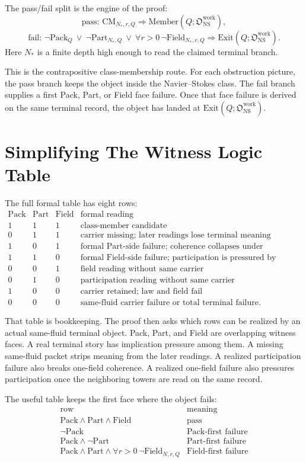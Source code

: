 \documentclass[11pt]{article}
\newcommand{\NS}{\mathrm{NS}}
\newcommand{\Pack}{\mathrm{Pack}}
\newcommand{\Part}{\mathrm{Part}}
\newcommand{\Field}{\mathrm{Field}}
\newcommand{\Member}{\mathrm{Member}}
\newcommand{\Exit}{\mathrm{Exit}}
\newcommand{\CM}{\mathrm{CM}}
\newcommand{\Owork}{\mathfrak O_{\NS}^{\mathrm{work}}}
\begin{document}
The pass/fail split is the engine of the proof:
\[
  \text{pass: }\CM_{N_*,r,Q}\Longrightarrow\Member(Q;\Owork),
\]
\[
  \text{fail: }\neg\Pack_Q\ \vee\ \neg\Part_{N_*,Q}\ \vee\ \forall r>0\,\neg\Field_{N_*,r,Q}
  \Longrightarrow \Exit(Q;\Owork).
\]
Here \(N_*\) is a finite depth high enough to read the claimed terminal branch.

This is the contrapositive class-membership route.
For each obstruction picture, the pass branch keeps the object inside the Navier--Stokes class.
The fail branch supplies a first Pack, Part, or Field face failure.
Once that face failure is derived on the same terminal record, the object has landed at \(\Exit(Q;\Owork)\).

\section{Simplifying The Witness Logic Table}

The full formal table has eight rows:
\[
\begin{array}{c|c|c|l}
\Pack & \Part & \Field & \text{formal reading}\\ \hline
1&1&1& \text{class-member candidate}\\
0&1&1& \text{carrier missing; later readings lose terminal meaning}\\
1&0&1& \text{formal Part-side failure; coherence collapses under realization}\\
1&1&0& \text{formal Field-side failure; participation is pressured by realization}\\
0&0&1& \text{field reading without same carrier}\\
0&1&0& \text{participation reading without same carrier}\\
1&0&0& \text{carrier retained; law and field fail}\\
0&0&0& \text{same-fluid carrier failure or total terminal failure.}
\end{array}
\]

That table is bookkeeping.
The proof then asks which rows can be realized by an actual same-fluid terminal object.
Pack, Part, and Field are overlapping witness faces.
A real terminal story has implication pressure among them.
A missing same-fluid packet strips meaning from the later readings.
A realized participation failure also breaks one-field coherence.
A realized one-field failure also pressures participation once the neighboring towers are read on the same record.

The useful table keeps the first face where the object fails:
\[
\begin{array}{c|l}
\text{row} & \text{meaning}\\ \hline
\Pack\wedge\Part\wedge\Field & \text{pass}\\
\neg\Pack & \text{Pack-first failure}\\
\Pack\wedge\neg\Part & \text{Part-first failure}\\
\Pack\wedge\Part\wedge\forall r>0\,\neg\Field_{N,r,Q} & \text{Field-first failure}
\end{array}
\]
\end{document}
